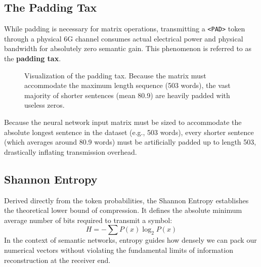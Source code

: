 \documentclass[10pt, conference]{IEEEtran}
\begin{document}
\subsection{\textbf{The Padding Tax}}
While padding is necessary for matrix operations, transmitting a \texttt{\textless PAD\textgreater} token through a physical 6G channel consumes actual electrical power and physical bandwidth for absolutely zero semantic gain. This phenomenon is referred to as the \textbf{padding tax}.

\begin{figure}[htbp]
\centering
{}
\caption{Visualization of the padding tax. Because the matrix must accommodate the maximum length sequence (503 words), the vast majority of shorter sentences (mean 80.9) are heavily padded with useless zeros.}
\label{fig:padding_tax}
\end{figure}

Because the neural network input matrix must be sized to accommodate the absolute longest sentence in the dataset (e.g., 503 words), every shorter sentence (which averages around 80.9 words) must be artificially padded up to length 503, drastically inflating transmission overhead.


\subsection{\textbf{Shannon Entropy}}
Derived directly from the token probabilities, the Shannon Entropy establishes the theoretical lower bound of compression. It defines the absolute minimum average number of bits required to transmit a symbol:
\begin{equation}
    H = - \sum P(x) \log_2 P(x)
\end{equation}
In the context of semantic networks, entropy guides how densely we can pack our numerical vectors without violating the fundamental limits of information reconstruction at the receiver end.
\end{document}
